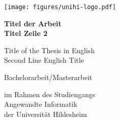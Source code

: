 \documentclass[11pt,        %
  english,ngerman,          %
  paper=a4,                 %
  captions=tablesignature,  %
  listof=numbered,          %
  bibliography=totoc,       %
  headings=small,           %
  headinclude=false,        %
  footinclude=false,        %
  parskip=half-,            %
  oneside,                  %
  BCOR=15mm,                 %
  DIV=12                    %
  ]{scrbook}                %
\begin{document}
\frontmatter



\begin{titlepage}
  \begin{center}
    \texttt{[image: figures/unihi-logo.pdf]}\\

    \vfill

    {
      \Large
      \bfseries
      Titel der Arbeit\\    
      Titel Zeile 2
      
      \vspace{0.25cm}
      \normalsize
      \mdseries
        Title of the Thesis in English\\
        Second Line English Title
    }

    \vfill

    {
      \normalsize

      Bachelorarbeit/Masterarbeit

      im Rahmen des Studiengangs\\
      Angewandte Informatik\\
      der Universität Hildesheim

      \vfill

}
\end{center}
\end{titlepage}
\end{document}

